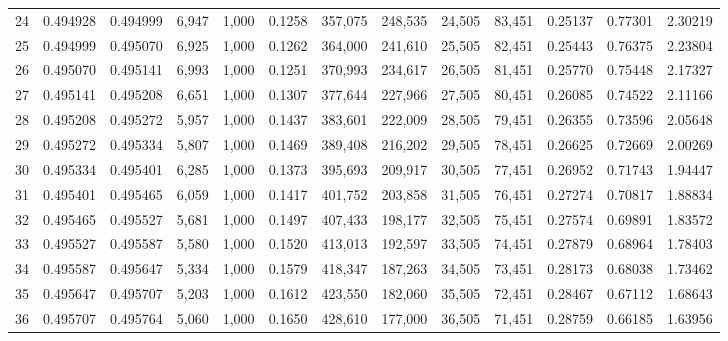 \begin{tabular}{rrrrrrrrrrrrr}
24  &  0.494928 &  0.494999 &   6,947 &  1,000 &                                     0.1258 &  357,075 &  248,535 &   24,505 &   83,451 &  0.25137 &  0.77301 &  2.30219 \\
25  &  0.494999 &  0.495070 &   6,925 &  1,000 &                                     0.1262 &  364,000 &  241,610 &   25,505 &   82,451 &  0.25443 &  0.76375 &  2.23804 \\
26  &  0.495070 &  0.495141 &   6,993 &  1,000 &                                     0.1251 &  370,993 &  234,617 &   26,505 &   81,451 &  0.25770 &  0.75448 &  2.17327 \\
27  &  0.495141 &  0.495208 &   6,651 &  1,000 &                                     0.1307 &  377,644 &  227,966 &   27,505 &   80,451 &  0.26085 &  0.74522 &  2.11166 \\
28  &  0.495208 &  0.495272 &   5,957 &  1,000 &                                     0.1437 &  383,601 &  222,009 &   28,505 &   79,451 &  0.26355 &  0.73596 &  2.05648 \\
29  &  0.495272 &  0.495334 &   5,807 &  1,000 &                                     0.1469 &  389,408 &  216,202 &   29,505 &   78,451 &  0.26625 &  0.72669 &  2.00269 \\
30  &  0.495334 &  0.495401 &   6,285 &  1,000 &                                     0.1373 &  395,693 &  209,917 &   30,505 &   77,451 &  0.26952 &  0.71743 &  1.94447 \\
31  &  0.495401 &  0.495465 &   6,059 &  1,000 &                                     0.1417 &  401,752 &  203,858 &   31,505 &   76,451 &  0.27274 &  0.70817 &  1.88834 \\
32  &  0.495465 &  0.495527 &   5,681 &  1,000 &                                     0.1497 &  407,433 &  198,177 &   32,505 &   75,451 &  0.27574 &  0.69891 &  1.83572 \\
33  &  0.495527 &  0.495587 &   5,580 &  1,000 &                                     0.1520 &  413,013 &  192,597 &   33,505 &   74,451 &  0.27879 &  0.68964 &  1.78403 \\
34  &  0.495587 &  0.495647 &   5,334 &  1,000 &                                     0.1579 &  418,347 &  187,263 &   34,505 &   73,451 &  0.28173 &  0.68038 &  1.73462 \\
35  &  0.495647 &  0.495707 &   5,203 &  1,000 &                                     0.1612 &  423,550 &  182,060 &   35,505 &   72,451 &  0.28467 &  0.67112 &  1.68643 \\
36  &  0.495707 &  0.495764 &   5,060 &  1,000 &                                     0.1650 &  428,610 &  177,000 &   36,505 &   71,451 &  0.28759 &  0.66185 &  1.63956 \\

\end{tabular}
